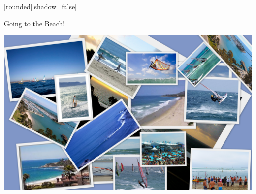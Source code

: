 \documentclass[10pt]{beamer}
\begin{document}
{
[rounded][shadow=false]
\begin{frame}{Going to the Beach!}

\begin{center}
\includegraphics[width=1\linewidth]{graphics/windsurfingPhotos.jpg}
\end{center}


\end{frame}}
\end{document}

